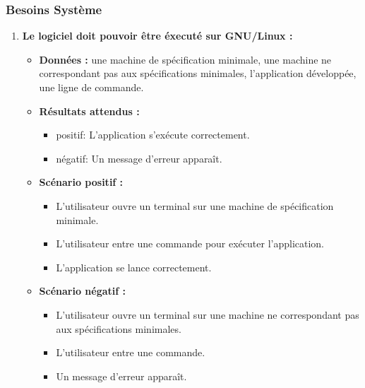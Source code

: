 \subsubsection{Besoins Système}
\begin{enumerate}
    \item \textbf{Le logiciel doit pouvoir être éxecuté sur GNU/Linux :}
    \begin{itemize}
        \item \textbf{Données :} une machine de spécification minimale, une machine ne correspondant pas aux spécifications minimales, l'application développée, une ligne de commande.
        \item \textbf{Résultats attendus :} 
        \begin{itemize}
            \item positif: L'application s'exécute correctement.
            \item négatif: Un message d'erreur apparaît. 
        \end{itemize}
        \item \textbf{Scénario positif :}
        \begin{itemize}
            \item L’utilisateur ouvre un terminal sur une machine de spécification minimale.
            \item L’utilisateur entre une commande pour exécuter l'application.
            \item L'application se lance correctement.
        \end{itemize}
        \item \textbf{Scénario négatif :}
        \begin{itemize}
            \item L’utilisateur ouvre un terminal sur une machine ne correspondant pas aux spécifications minimales.
            \item L’utilisateur entre une commande.
            \item Un message d'erreur apparaît.
        \end{itemize}
    \end{itemize}


\end{enumerate}
